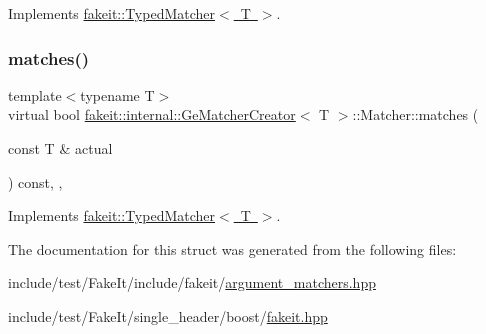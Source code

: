 Implements \mbox{\hyperlink{structfakeit_1_1TypedMatcher_ac553bb6ac7c98a489c92fa6ace0f2e2b}{fakeit\+::\+Typed\+Matcher$<$ T $>$}}.

\mbox{\label{structfakeit_1_1internal_1_1GeMatcherCreator_1_1Matcher_a5f89ea76a9474243dedbfc74bb1ba380}} 
\subsubsection{\texorpdfstring{matches()}{matches()}\hspace{0.1cm}{\footnotesize\ttfamily [9/9]}}
{\footnotesize\ttfamily template$<$typename T$>$ \\
virtual bool \mbox{\hyperlink{structfakeit_1_1internal_1_1GeMatcherCreator}{fakeit\+::internal\+::\+Ge\+Matcher\+Creator}}$<$ T $>$\+::Matcher\+::matches (\begin{DoxyParamCaption}\item[{const T \&}]{actual }\end{DoxyParamCaption}) const\hspace{0.3cm}{\ttfamily [inline]}, {\ttfamily [override]}, {\ttfamily [virtual]}}



Implements \mbox{\hyperlink{structfakeit_1_1TypedMatcher_ac553bb6ac7c98a489c92fa6ace0f2e2b}{fakeit\+::\+Typed\+Matcher$<$ T $>$}}.



The documentation for this struct was generated from the following files\+:\begin{DoxyCompactItemize}
\item 
include/test/\+Fake\+It/include/fakeit/\mbox{\hyperlink{argument__matchers_8hpp}{argument\+\_\+matchers.\+hpp}}\item 
include/test/\+Fake\+It/single\+\_\+header/boost/\mbox{\hyperlink{single__header_2boost_2fakeit_8hpp}{fakeit.\+hpp}}\end{DoxyCompactItemize}
